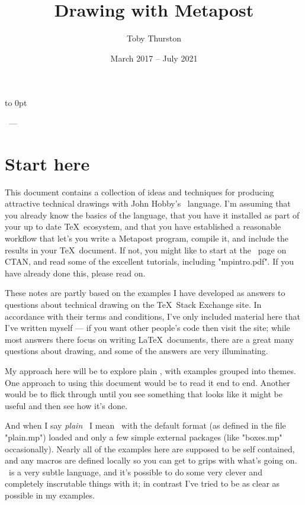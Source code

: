 \documentclass[a4paper,landscape]{article}
\title{Drawing with Metapost}
\author{Toby Thurston}
\date{March 2017 – July 2021}
\begin{document}
\pagestyle{empty}
\raggedbottom
\makeatletter
\moveright 6in\vbox to
0pt{\vskip23pt\noindent\sffamily{\Large\bfseries\@title}\par\bigskip
    \noindent\@author\ --- \@date\par
    \bigskip
\vss}
\makeatother
\section{Start here}

This document contains a collection of ideas and techniques for producing attractive
technical drawings with John Hobby’s \MP\ language.  I’m assuming that you already
know the basics of the language, that you have it installed as part of your up to
date \TeX\ ecosystem, and that you have established a reasonable workflow that
let’s you write a Metapost program, compile it, and include the results in your
\TeX\ document.  If not, you might like to start at the \MP\ page on CTAN, and read
some of the excellent tutorials, including "mpintro.pdf".  If you have already done
this, please read on.

These notes are partly based on the examples I have developed as answers
to questions about technical drawing on the \TeX\ Stack Exchange site.  In
accordance with their terms and conditions, I’ve only included material here that
I’ve written myself --- if you want other people’s code then visit the site;
while most answers there focus on writing \LaTeX\ documents, there are a great
many questions about drawing, and some of the answers are very illuminating.

My approach here will be to explore plain \MP, with examples grouped
into themes.  One approach to using this document would be to read it end to end.
Another would be to flick through until you see something that looks like it might
be useful and then see how it’s done.

And when I say \textit{plain} \MP\ I mean \MP\ with the default format (as defined
in the file "plain.mp") loaded and only a few simple external packages (like
"boxes.mp" occasionally).  Nearly all of the examples here are supposed to be self
contained, and any macros are defined locally so you can get to grips with what’s
going on.  \MP\ is a very subtle language, and it’s possible to do some very clever
and completely inscrutable things with it;  in contrast I’ve tried to be as clear as
possible in my examples.
\end{document}
